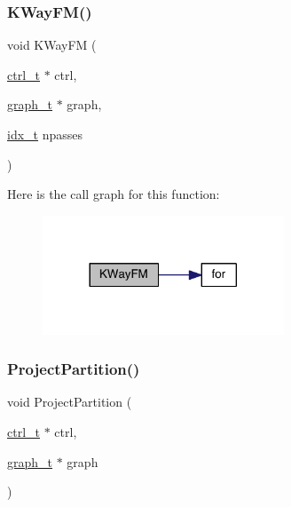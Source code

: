 \subsubsection{\texorpdfstring{K\+Way\+F\+M()}{KWayFM()}}
{\footnotesize\ttfamily void K\+Way\+FM (\begin{DoxyParamCaption}\item[{\hyperlink{a00742}{ctrl\+\_\+t} $\ast$}]{ctrl,  }\item[{\hyperlink{a00734}{graph\+\_\+t} $\ast$}]{graph,  }\item[{\hyperlink{a00876_aaa5262be3e700770163401acb0150f52}{idx\+\_\+t}}]{npasses }\end{DoxyParamCaption})}

Here is the call graph for this function\+:\nopagebreak
\begin{figure}[H]
\begin{center}
\leavevmode
\includegraphics[width=204pt]{a00918_aa8348aa8c00e61bdc9f77041bea6eba9_cgraph}
\end{center}
\end{figure}
\mbox{\label{a00918_a1855d8886d0181410fa4e010c9792105}} 
\subsubsection{\texorpdfstring{Project\+Partition()}{ProjectPartition()}}
{\footnotesize\ttfamily void Project\+Partition (\begin{DoxyParamCaption}\item[{\hyperlink{a00742}{ctrl\+\_\+t} $\ast$}]{ctrl,  }\item[{\hyperlink{a00734}{graph\+\_\+t} $\ast$}]{graph }\end{DoxyParamCaption})}

